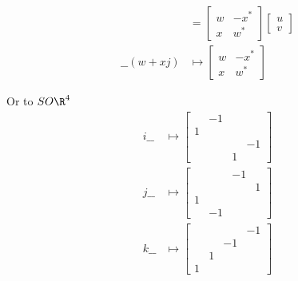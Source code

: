 \documentclass{scrartcl}
\newcommand{\SO}{SO}
\renewcommand{\blank}{\_\_}
\begin{document}
\begin{multicols*}{2}
\begin{align*}
    &=
    \begin{bmatrix}
      w & -x^* \\
      x & w^*
    \end{bmatrix}
    \begin{bmatrix}
      u\\ v
    \end{bmatrix}
    \\
    \blank(w+xj) &\mapsto
                   \begin{bmatrix}
                     w & -x^* \\ x & w^*
                   \end{bmatrix}
  \end{align*}

  Or to \(\SO\R^4\)
  \begin{align*}
    i\blank&\mapsto
       \begin{bmatrix}
          & -1\\
         1 \\
          & & & -1\\
          & & 1
       \end{bmatrix} \\
    j\blank & \mapsto
              \begin{bmatrix}
                && -1\\
                &&    &1\\
                1         \\
                & -1
              \end{bmatrix} \\
    k \blank & \mapsto
               \begin{bmatrix}
                 &  &  &-1\\
                 &  &-1\\
                 & 1\\
                 1
               \end{bmatrix} \\
  \end{align*}


\end{multicols*}
\end{document}
